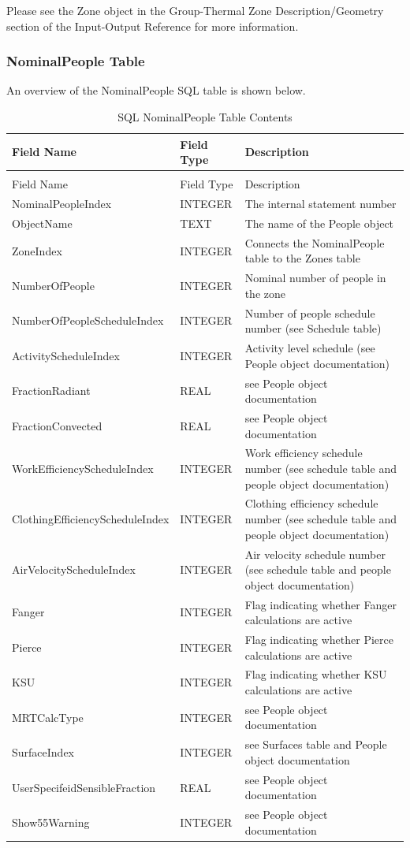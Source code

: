 Please see the Zone object in the Group-Thermal Zone Description/Geometry section of the Input-Output Reference for more information.

\subsubsection{NominalPeople Table}

An overview of the NominalPeople SQL table is shown below.

{\scriptsize
\begin{longtable}[c]{>{\raggedright}p{1.5in}>{\raggedright}p{1.5in}>{\raggedright}p{3.0in}}
\caption{SQL NominalPeople Table Contents \label{table:table-15.-sql-nominalpeople-table-contents}} \tabularnewline
\toprule
Field Name & Field Type & Description \tabularnewline
\midrule
\endfirsthead

\caption[]{SQL NominalPeople Table Contents} \tabularnewline
\toprule
Field Name & Field Type & Description \tabularnewline
\midrule
\endhead

NominalPeopleIndex & INTEGER & The internal statement number \tabularnewline
ObjectName & TEXT & The name of the People object \tabularnewline
ZoneIndex & INTEGER & Connects the NominalPeople table to the Zones table \tabularnewline
NumberOfPeople & INTEGER & Nominal number of people in the zone \tabularnewline
NumberOfPeople\-Schedule\-Index & INTEGER & Number of people schedule number (see Schedule table) \tabularnewline
ActivitySchedule\-Index & INTEGER & Activity level schedule (see People object documentation) \tabularnewline
FractionRadiant & REAL & see People object documentation \tabularnewline
FractionConvected & REAL & see People object documentation \tabularnewline
WorkEfficiency\-Schedule\-Index & INTEGER & Work efficiency schedule number (see schedule table and people object documentation) \tabularnewline
ClothingEfficiency\-Schedule\-Index & INTEGER & Clothing efficiency schedule number (see schedule table and people object documentation) \tabularnewline
AirVelocitySchedule\-Index & INTEGER & Air velocity schedule number (see schedule table and people object documentation) \tabularnewline
Fanger & INTEGER & Flag indicating whether Fanger calculations are active \tabularnewline
Pierce & INTEGER & Flag indicating whether Pierce calculations are active \tabularnewline
KSU & INTEGER & Flag indicating whether KSU calculations are active \tabularnewline
MRTCalcType & INTEGER & see People object documentation \tabularnewline
SurfaceIndex & INTEGER & see Surfaces table and People object documentation \tabularnewline
UserSpecifeid\-Sensible\-Fraction & REAL & see People object documentation \tabularnewline
Show55Warning & INTEGER & see People object documentation \tabularnewline
\bottomrule
\end{longtable}}

